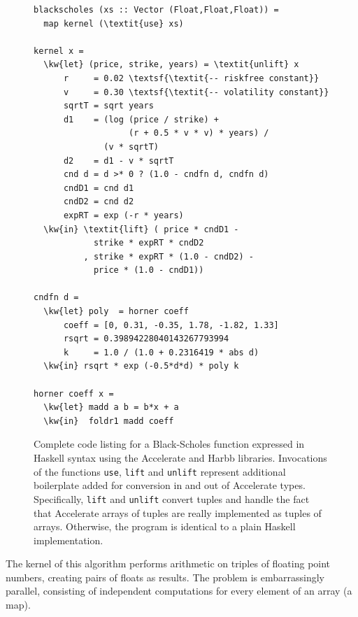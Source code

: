 \documentclass[conference]{IEEEtran}
\newcommand{\cde}[1]{{\footnotesize \tt #1}}
\newcommand{\kw}[1]{{\textbf{#1}}}
\newcommand{\systemname}[0]{{Harbb}}
\begin{document}
\begin{figure}
\begin{footnotesize}
\begin{Verbatim}[frame=single, commandchars=\\\{\}]
blackscholes (xs :: Vector (Float,Float,Float)) = 
  map kernel (\textit{use} xs)

kernel x =
  \kw{let} (price, strike, years) = \textit{unlift} x
      r     = 0.02 \textsf{\textit{-- riskfree constant}}
      v     = 0.30 \textsf{\textit{-- volatility constant}}
      sqrtT = sqrt years
      d1    = (log (price / strike) + 
                   (r + 0.5 * v * v) * years) / 
              (v * sqrtT)
      d2    = d1 - v * sqrtT
      cnd d = d >* 0 ? (1.0 - cndfn d, cndfn d)
      cndD1 = cnd d1
      cndD2 = cnd d2
      expRT = exp (-r * years)
  \kw{in} \textit{lift} ( price * cndD1 - 
            strike * expRT * cndD2
          , strike * expRT * (1.0 - cndD2) - 
            price * (1.0 - cndD1))

cndfn d =
  \kw{let} poly  = horner coeff
      coeff = [0, 0.31, -0.35, 1.78, -1.82, 1.33]
      rsqrt = 0.39894228040143267793994
      k     = 1.0 / (1.0 + 0.2316419 * abs d)
  \kw{in} rsqrt * exp (-0.5*d*d) * poly k

horner coeff x = 
  \kw{let} madd a b = b*x + a
  \kw{in}  foldr1 madd coeff
\end{Verbatim}
\end{footnotesize}
\caption{Complete code listing for a Black-Scholes function expressed
  in Haskell syntax using the Accelerate and \systemname{} libraries.
  Invocations of the functions \cde{use}, \cde{lift} and \cde{unlift}
represent additional boilerplate added for
  conversion in and out of Accelerate types.  Specifically, \cde{lift} and
  \cde{unlift} convert tuples and handle the fact that Accelerate
  arrays of tuples are really implemented as tuples of arrays.
  Otherwise, the program is identical to a plain Haskell
  implementation.}
\label{fig:blackscholes}
\end{figure}





The kernel of this algorithm performs arithmetic on triples of
floating point numbers, creating pairs of floats as results. The problem 
is embarrassingly parallel, consisting of independent computations
for every element of an array (a map).
\end{document}
